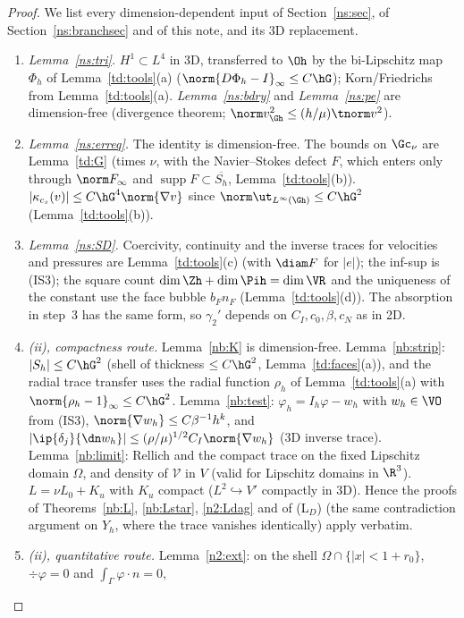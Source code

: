 \begin{proof}
We list every dimension-dependent input of Section~\ref{ns:sec}, of Section~\ref{ns:branchsec} and of this note, and its 3D replacement.
\begin{enumerate}
\item \emph{Lemma~\ref{ns:tri}.} $H^1\subset L^4$ in 3D, transferred to $\Oh$ by the bi-Lipschitz map $\Phi_h$ of Lemma~\ref{td:tools}(a)
($\norm{D\Phi_h-I}_\infty\le C\hG$); Korn/Friedrichs from Lemma~\ref{td:tools}(a). \emph{Lemma~\ref{ns:bdry}} and \emph{Lemma~\ref{ns:pe}} are
dimension-free (divergence theorem; $\norm v^2_{\Gh}\le(h/\mu)\tnorm v^2$).
\item \emph{Lemma~\ref{ns:erreq}.} The identity is dimension-free. The bounds on $\Gc_\nu$ are Lemma~\ref{td:G} (times $\nu$, with the
Navier--Stokes defect $F$, which enters only through $\norm F_\infty$ and $\operatorname{supp}F\subset\overline{S_h}$, Lemma~\ref{td:tools}(b)).
$|\kappa_{c_s}(v)|\le C\hG^4\norm{\nabla v}$ since $\norm\ut_{L^\infty(\Gh)}\le C\hG^2$ (Lemma~\ref{td:tools}(b)).
\item \emph{Lemma~\ref{ns:SD}.} Coercivity, continuity and the inverse traces for velocities and pressures are Lemma~\ref{td:tools}(c) (with
$\diam F$ for $|e|$); the inf-sup is (IS3); the square count $\dim\Zh+\dim\Pih=\dim\VR$ and the uniqueness of the constant use the face bubble
$b_Fn_F$ (Lemma~\ref{td:tools}(d)). The absorption in step~3 has the same form, so $\gamma_2'$ depends on $C_I,c_0,\beta,c_N$ as in 2D.
\item \emph{(ii), compactness route.} Lemma~\ref{nb:K} is dimension-free. Lemma~\ref{nb:strip}: $|S_h|\le C\hG^2$ (shell of thickness $\le C\hG^2$,
Lemma~\ref{td:faces}(a)), and the radial trace transfer uses the radial function $\rho_h$ of Lemma~\ref{td:tools}(a) with $\norm{\rho_h-1}_\infty\le C\hG^2$.
Lemma~\ref{nb:test}: $\varphi_h=I_h\varphi-w_h$ with $w_h\in\VO$ from (IS3), $\norm{\nabla w_h}\le C\beta^{-1}h^k$, and
$|\ip{\delta_j}{\dn w_h}|\le(\rho/\mu)^{1/2}C_I\norm{\nabla w_h}$ (3D inverse trace). Lemma~\ref{nb:limit}: Rellich and the compact trace on the fixed
Lipschitz domain $\Omega$, and density of $\mathcal V$ in $V$ \cite[Ch.~I, Thm~1.6]{Temam} (valid for Lipschitz domains in $\R^3$). $L=\nu L_0+K_u$
with $K_u$ compact ($L^2\hookrightarrow V'$ compactly in 3D). Hence the proofs of Theorems~\ref{nb:L}, \ref{nb:Lstar}, \ref{n2:Ldag} and of (L$_D$)
(the same contradiction argument on $Y_h$, where the trace vanishes identically) apply verbatim.
\item \emph{(ii), quantitative route.} Lemma~\ref{n2:ext}: on the shell $\Omega\cap\{|x|<1+r_0\}$, $\div\varphi=0$ and $\int_\Gamma\varphi\cdot n=0$,

\end{enumerate}
\end{proof}

